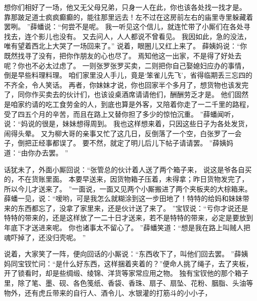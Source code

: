 想你们相好了一场，他又无父母兄弟，只身一人在此，你也该各处找一找才是。
靠那跛足道士疯疯癫癫的，能往那里远去！左不过在这房前左右的庙里寺里躲藏着罢咧。
”薛蟠说：“何尝不是呢。
我一听见这个信儿，就连忙带了小厮们在各处寻找去，连个影儿也没有。
又去问人，人人都说不曾看见。
我因如此，急的没法，唯有望着西北上大哭了一场回来了。”
说着，眼圈儿又红上来了。
薛姨妈说：“你既然找寻了没有，把你作朋友的心也尽了。
焉知他这一出家，不是得了好处去呢？你也不必太过虑了。
一则张罗张罗买卖，二则把你自己娶媳妇应办的事情，倒是早些料理料理。
咱们家里没人手儿，竟是‘笨雀儿先飞’，省得临期丢三忘四的不齐全，令人笑话。
再者，你妹妹才说，你也回家半个多月了，想货物也该发完了，同你作买卖去的伙计们，也该设桌酒席请请他们，酬酬劳乏才是。
他们固然是咱家约请的吃工食劳金的人，到底也算是外客，又陪着你走了一二千里的路程，受了四五个月的辛苦，而且在路上又替你担了多少的惊怕沉重。
”薛蟠闻听，说：“妈说的很是，妹妹想得周到。
我也这样想来着，只因这些日子为各处发货，闹得头晕。
又为柳大哥的亲事又忙了这几日，反倒落了一个空，白张罗了一会子，倒把正经事都误了。
要不然，就定了明儿后儿下帖子请请罢。
”薛姨妈道：“由你办去罢。
”\par
话犹未了，外面小厮回说：“张管总的伙计着人送了两个箱子来，
说这是爷各自买的，不在货账里面。
本要早送来，因货物箱子压着，未得拿；昨日货物发完了，所以今儿才送来了。
”一面说，一面又见两个小厮搬进了两个夹板夹的大棕箱来。
薛蟠一见，说：“嗳哟，可是我怎么就糊涂到这一步田地了！特特的给妈和妹妹带来的东西都忘了，没拿了家里来，还是伙计送了来了。
”宝钗说：“亏你才说还是特特的带来的，还是这样放了一二十日才送来，若不是特特的带来，必定是要放到年底下才送进来呢。
你也诸事太不留心了。
”薛蟠笑道：“想是我在路上叫贼人把魂吓掉了，还没归壳呢。
”\par
说着，大家笑了一阵，便向回话的小厮说：“东西收下了，叫他们回去罢。
”薛姨妈同宝钗忙问：“是什么好东西，这样捆着夹着的？”便命人挑了绳子，去了夹板，开了锁看时，却是些绸缎、绫锦、洋货等家常应用之物。
独有宝钗他的那个箱子里，除了笔、墨、砚、各色笺纸、香袋、香珠、扇子、扇坠、花粉、胭脂、头油等物外，还有虎丘带来的自行人、酒令儿、水银灌的打筋斗的小小子，
